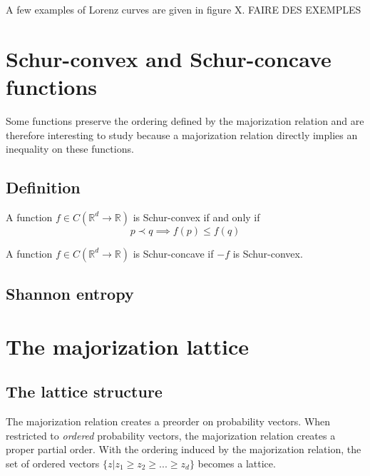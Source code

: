 A few examples of Lorenz curves are given in figure X. FAIRE DES EXEMPLES




\section{Schur-convex and Schur-concave functions}

Some functions preserve the ordering defined by the majorization relation and are therefore interesting to study because a majorization relation directly implies an inequality on these functions.

\subsection{Definition}

\begin{definition}
    A function $f \in C(\mathbb{R}^d \to \mathbb{R})$ is Schur-convex if and only if
    \begin{equation}
        p \prec q \implies f(p) \leq f(q)
    \end{equation}
\end{definition}

\begin{definition}
    A function $f \in C(\mathbb{R}^d \to \mathbb{R})$ is Schur-concave if $-f$ is Schur-convex.
\end{definition}



\subsection{Shannon entropy}



\section{The majorization lattice} \label{sec:majorization_lattice}

\subsection{The lattice structure}

The majorization relation creates a preorder on probability vectors. When restricted to \textit{ordered} probability vectors, the majorization relation creates a proper partial order. With the ordering induced by the majorization relation, the set of ordered vectors $\{z | z_1 \geq z_2 \geq ... \geq z_d\}$ becomes a lattice.

